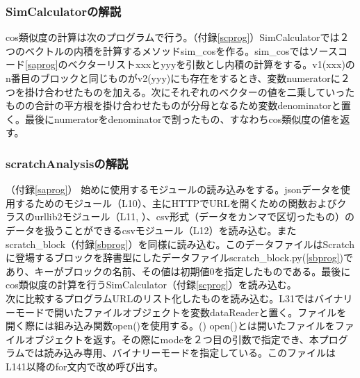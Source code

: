 \documentclass[a4paper,10pt,onecolumn,oneside,openany]{jsbook}
\begin{document}
\subsubsection{SimCalculatorの解説}
cos類似度の計算は次のプログラムで行う。（付録\ref{scprog}）SimCalculatorでは２つのベクトルの内積を計算するメソッドsim\_cosを作る。sim\_cosではソースコード\ref{saprog}のベクターリストxxxとyyyを引数とし内積の計算をする。v1(xxx)のn番目のブロックと同じものがv2(yyy)にも存在をするとき、変数numeratorに２つを掛け合わせたものを加える。次にそれぞれのベクターの値を二乗していったものの合計の平方根を掛け合わせたものが分母となるため変数denominatorと置く。最後にnumeratorをdenominatorで割ったもの、すなわちcos類似度の値を返す。

\subsubsection{scratchAnalysisの解説}（付録\ref{saprog}）
始めに使用するモジュールの読み込みをする。jsonデータを使用するためのモジュール（L10）、主にHTTPでURLを開くための関数およびクラスのurllib2モジュール（L11, \cite{urllib}）、csv形式（データをカンマで区切ったもの）のデータを扱うことができるcsvモジュール（L12）を読み込む。またscratch\_block（付録\ref{sbprog}）を同様に読み込む。このデータファイルはScratchに登場するブロックを辞書型にしたデータファイルscratch\_block.py(\ref{sbprog})であり、キーがブロックの名前、その値は初期値0を指定したものである。最後にcos類似度の計算を行うSimCalculator（付録\ref{scprog}）を読み込む。
\\
次に比較するプログラムURLのリスト化したものを読み込む。L31ではバイナリーモードで開いたファイルオブジェクトを変数dataReaderと置く。ファイルを開く際には組み込み関数open()を使用する。(\cite{open}) open()とは開いたファイルをファイルオブジェクトを返す。その際にmodeを２つ目の引数で指定でき、本プログラムでは読み込み専用、バイナリーモードを指定している。このファイルはL141以降のfor文内で改め呼び出す。
\end{document}
